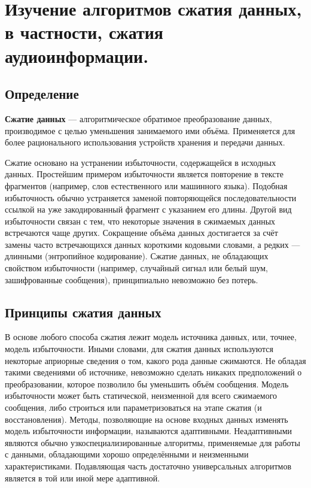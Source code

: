 \documentclass[a4paper]{report}
\begin{document}
\chapter{Изучение алгоритмов сжатия данных, в частности, сжатия
аудиоинформации.}
\section{Определение}
\textbf{Сжатие данных} — алгоритмическое обратимое преобразование данных, производимое с целью уменьшения занимаемого ими объёма. Применяется для более рационального использования устройств хранения и передачи данных.
\par Сжатие основано на устранении избыточности, содержащейся в исходных данных. Простейшим примером избыточности является повторение в тексте фрагментов (например, слов естественного или машинного языка). Подобная избыточность обычно устраняется заменой повторяющейся последовательности ссылкой на уже закодированный фрагмент с указанием его длины. Другой вид избыточности связан с тем, что некоторые значения в сжимаемых данных встречаются чаще других. Сокращение объёма данных достигается за счёт замены часто встречающихся данных короткими кодовыми словами, а редких — длинными (энтропийное кодирование). Сжатие данных, не обладающих свойством избыточности (например, случайный сигнал или белый шум, зашифрованные сообщения), принципиально невозможно без потерь.
\section{Принципы сжатия данных}
В основе любого способа сжатия лежит модель источника данных, или, точнее, модель избыточности. Иными словами, для сжатия данных используются некоторые априорные сведения о том, какого рода данные сжимаются. Не обладая такими сведениями об источнике, невозможно сделать никаких предположений о преобразовании, которое позволило бы уменьшить объём сообщения. Модель избыточности может быть статической, неизменной для всего сжимаемого сообщения, либо строиться или параметризоваться на этапе сжатия (и восстановления). Методы, позволяющие на основе входных данных изменять модель избыточности информации, называются адаптивными. Неадаптивными являются обычно узкоспециализированные алгоритмы, применяемые для работы с данными, обладающими хорошо определёнными и неизменными характеристиками. Подавляющая часть достаточно универсальных алгоритмов является в той или иной мере адаптивной.
\end{document}
